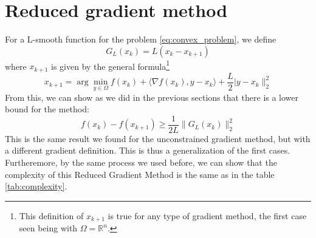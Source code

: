 \documentclass[12pt, openany]{report}
\theoremstyle{definition}
\begin{document}
\section{Reduced gradient method}
For a L-smooth function for the problem \eqref{eq:convex_problem}, we define 
\begin{equation}
    G_L(x_k) = L(x_k-x_{k+1})
\end{equation}
where \(x_{k+1}\) is given by the general formula\footnote{This definition of \(x_{k+1}\) is true for any type of gradient method, the first case seen being with \(\Omega = \mathbb{R}^n\).}
\begin{equation}
    x_{k+1} = \arg \min_{y\in \Omega} f(x_k) + \langle \nabla f(x_k),y-x_k\rangle +\frac{L}{2}\lvert y-x_k\rVert_2^2
\end{equation}
From this, we can show as we did in the previous sections that there is a lower bound for the method:
\begin{equation}
    f(x_k)-f(x_{k+1}) \ge \frac{1}{2L}\lVert G_L(x_k)\rVert_2^2
\end{equation}
This is the same result we found for the unconstrained gradient method, but with a different gradient definition. This is thus a generalization of the first cases. Furtheremore, by the same process we used before, we can show that the complexity of this Reduced Gradient Method is the same as in the table \ref{tab:complexity}.
\end{document}

